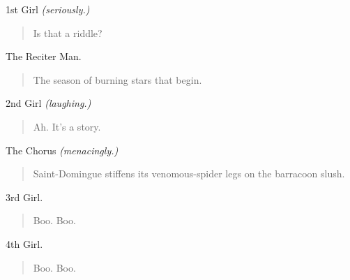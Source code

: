 \documentclass[letterpaper,article,12pt,oneside,notitlepage]{memoir}
\begin{document}
\clearpage

\begin{center}1st Girl \textit{(seriously.)}\end{center}

\begin{verse}
\hspace{1cm} Is that a riddle? \\
\end{verse}

\begin{center}The Reciter Man.\end{center}

\begin{verse}
\hspace{1cm} The season of burning stars that begin. \\
\end{verse}

\begin{center}2nd Girl \textit{(laughing.)}\end{center}

\begin{verse}
\hspace{1cm} Ah. It's a story. \\
\end{verse}

\begin{center}The Chorus \textit{(menacingly.)}\end{center}

\begin{verse}
\indent Saint-Domingue stiffens its venomous-spider legs on the barracoon slush. \\
\end{verse}

\begin{center}3rd Girl.\end{center}

\begin{verse}
\hspace{1cm} Boo. Boo. \\
\end{verse}

\begin{center}4th Girl.\end{center}

\begin{verse}
\hspace{1cm} Boo. Boo. \\
\end{verse}
\end{document}
